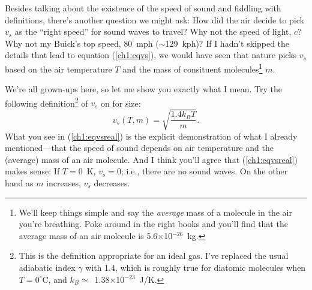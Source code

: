 Besides talking about the existence of the speed of sound and fiddling with
definitions, there's another question we might ask: How did the air decide to
pick $v_s$ as the ``right speed'' for sound waves to travel? Why not the speed
of light, $c$? Why not my Buick's top speed, 80~mph ($\sim$129~kph)? If I hadn't
skipped the details that lead to equation (\ref{ch1:eqvs}), we would have seen
that nature picks $v_s$ based on the air temperature $T$ and the mass of
consituent molecules\footnote{We'll keep things simple and say the
  \emph{average} mass of a molecule in the air you're breathing. Poke around in
  the right books and you'll find that the average mass of an air molecule is
  5.6$\times$10$^{-26}$~kg.} $m$.

We're all grown-ups here, so let me show you exactly what I mean. Try
the following definition\footnote{This is the definition appropriate for an
  ideal gas. I've replaced the usual adiabatic index $\gamma$ with 1.4, which is
  roughly true for diatomic molecules when $T = 0 ^{\circ}$C, and
  $k_B \simeq$~1.38$\times$10$^{-23}$~J/K.} of $v_s$ on for size:
\begin{equation}
  \label{ch1:eqvsreal}
  v_s (T,m) = \sqrt{\dfrac{1.4 k_B T}{m}}.
\end{equation}
What you see in (\ref{ch1:eqvsreal}) is the explicit demonstration of what I
already mentioned---that the speed of sound depends on air temperature and the
(average) mass of an air molecule. And I think you'll agree that
(\ref{ch1:eqvsreal}) makes sense: If $T = 0$~K, $v_s = 0$; i.e., there are no sound
waves. On the other hand as $m$ increases, $v_s$ decreases.

